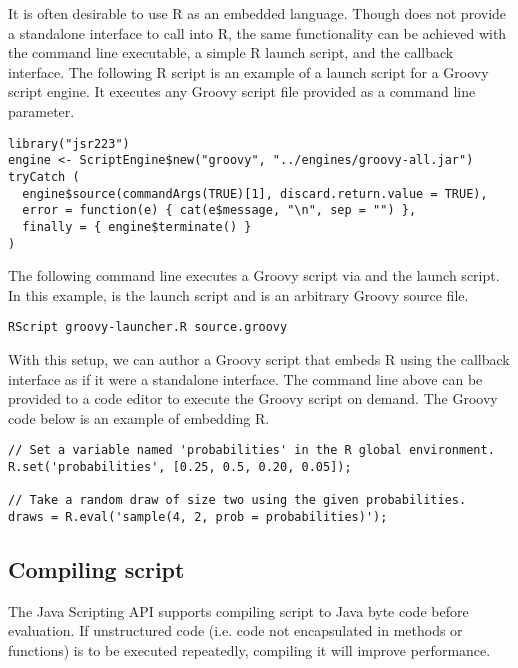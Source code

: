 It is often desirable to use R as an embedded language. Though  does not provide a standalone interface to call into R, the same functionality can be achieved with the  command line executable, a simple R launch script, and the  callback interface. The following R script is an example of a launch script for a Groovy script engine. It executes any Groovy script file provided as a command line parameter.

\begin{verbatim}
library("jsr223")
engine <- ScriptEngine$new("groovy", "../engines/groovy-all.jar")
tryCatch (
  engine$source(commandArgs(TRUE)[1], discard.return.value = TRUE),
  error = function(e) { cat(e$message, "\n", sep = "") },
  finally = { engine$terminate() }
)
\end{verbatim}

The following command line executes a Groovy script via  and the launch script. In this example,  is the launch script and  is an arbitrary Groovy source file.

\begin{verbatim}
RScript groovy-launcher.R source.groovy
\end{verbatim}

With this setup, we can author a Groovy script that embeds R using the  callback interface as if it were a standalone interface. The command line above can be provided to a code editor to execute the Groovy script on demand. The Groovy code below is an example of embedding R.

\begin{verbatim}
// Set a variable named 'probabilities' in the R global environment.
R.set('probabilities', [0.25, 0.5, 0.20, 0.05]);

// Take a random draw of size two using the given probabilities.
draws = R.eval('sample(4, 2, prob = probabilities)');
\end{verbatim}

\subsection{Compiling script}

The Java Scripting API supports compiling script to Java byte code before evaluation. If unstructured code (i.e. code not encapsulated in methods or functions) is to be executed repeatedly, compiling it will improve performance.

